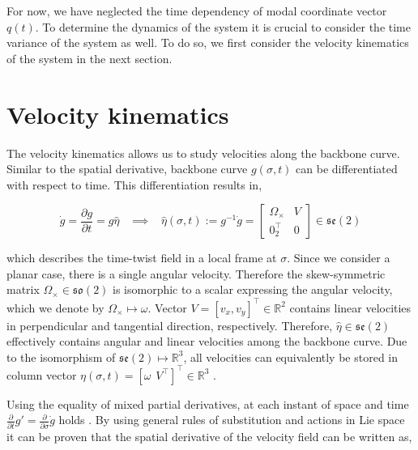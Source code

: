 For now, we have neglected the time dependency of modal coordinate vector $q(t)$. To determine the dynamics of the system it is crucial to consider the time variance of the system as well. To do so, we first consider the velocity kinematics of the system in the next section.


\section{Velocity kinematics}

The velocity kinematics allows us to study velocities along the backbone curve. Similar to the spatial derivative, backbone curve $g(\sigma,t)$ can be differentiated with respect to time. This differentiation results in, 

\begin{equation}
  \Dot{g} = \frac{\partial g}{\partial t} = g \hat{\eta} \hspace{10pt} \implies \hspace{10pt}  \hat{\eta}(\sigma,t) := g^{-1}\dot{g} = \begin{bmatrix} \Omega_\times & V \\ 0_2^\top & 0 \end{bmatrix} \in  \mathfrak{se}(2)
    \label{eq2:dgdt}
\end{equation}

which describes the time-twist field in a local frame at $\sigma$. Since we consider a planar case, there is a single angular velocity. Therefore the skew-symmetric matrix $\Omega_\times \in \mathfrak{so}(2)$ is isomorphic to a scalar expressing the angular velocity, which we denote by $\Omega_\times \longmapsto \omega$. Vector $V = [v_x,v_y]^\top \in \mathbb{R}^2$ contains linear velocities in perpendicular and tangential direction, respectively. Therefore, $\hat{\eta} \in \mathfrak{se}(2)$ effectively contains angular and linear velocities among the backbone curve. Due to the isomorphism of $\mathfrak{se}(2) \longmapsto \mathbb{R}^3$, all velocities can equivalently be stored in column vector $\eta(\sigma,t) = [\omega \hspace{5pt} V^\top]^\top \in \mathbb{R}^3$ \cite{Sola2018}.


Using the equality of mixed partial derivatives, at each instant of space and time $\frac{\partial}{\partial t}g' = \frac{\partial}{\partial \sigma}\dot{g}$ holds \cite{Caasenbrood2020}. By using general rules of substitution and actions in Lie space it can be proven that the spatial derivative of the velocity field can be written as,

